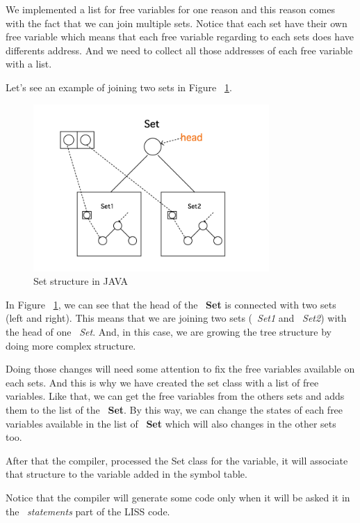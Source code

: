 \documentclass[
  oneside,
  11pt, a4paper,
  footinclude=true,
  headinclude=true,
  cleardoublepage=empty
]{scrbook}
\begin{document}
We implemented a list for free variables for one reason and this reason comes with the fact that we can join multiple sets.
Notice that each set have their own free variable which means that each free variable regarding to each sets does have differents address. And we need to collect all those addresses of each free variable with a list.

Let's see an example of joining two sets in Figure ~\ref{fig:sets_associaton}.

\begin{figure}[h!]
 \centering
  \includegraphics[width=0.8\textwidth]{img/sets_association.png}
  \caption{Set structure in JAVA}
  \label{fig:sets_associaton}
\end{figure}

In Figure ~\ref{fig:sets_associaton}, we can see that the head of the ~\textbf{Set} is connected with two sets (left and right). This means that we are joining two sets (~\textit{Set1} and ~\textit{Set2}) with the head of one ~\textit{Set}. And, in this case, we are growing the tree structure by doing more complex structure.

Doing those changes will need some attention to fix the free variables available on each sets. And this is why we have created the set class with a list of free variables. Like that, we can get the free variables from the others sets and adds them to the list of the ~\textbf{Set}. By this way, we can change the states of each free variables available in the list of ~\textbf{Set} which will also changes in the other sets too.

After that the compiler, processed the Set class for the variable, it will associate that structure to the variable added in the symbol table.

Notice that the compiler will generate some code only when it will be asked it in the ~\textit{statements} part of the LISS code.
\end{document}
